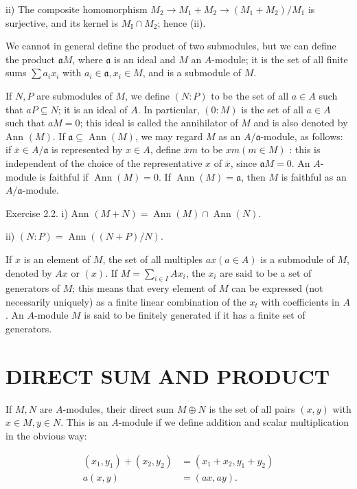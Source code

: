 \documentclass{standalone}
\theoremstyle{definition}
\theoremstyle{remark}
\begin{document}
ii) The composite homomorphism $M_{2} \rightarrow M_{1}+M_{2} \rightarrow\left(M_{1}+M_{2}\right) / M_{1}$ is surjective, and its kernel is $M_{\mathrm{I}} \cap M_{2}$; hence (ii).

We cannot in general define the product of two submodules, but we can define the product $\mathfrak{a} M$, where $\mathfrak{a}$ is an ideal and $M$ an $A$-module; it is the set of all finite sums $\sum a_{i} x_{i}$ with $a_{i} \in \mathfrak{a}, x_{i} \in M$, and is a submodule of $M$.

If $N, P$ are submodules of $M$, we define $(N: P)$ to be the set of all $a \in A$ such that $a P \subseteq N$; it is an ideal of $A$. In particular, $(0: M)$ is the set of all $a \in A$ such that $a M=0$; this ideal is called the annihilator of $M$ and is also denoted by Ann $(M)$. If $\mathfrak{a} \subseteq \operatorname{Ann}(M)$, we may regard $M$ as an $A / \mathfrak{a}$-module, as follows: if $\bar{x} \in A / \mathfrak{a}$ is represented by $x \in A$, define $\bar{x} m$ to be $x m(m \in M)$ : this is independent of the choice of the representative $x$ of $\bar{x}$, since $\mathfrak{a} M=0$. An $A$-module is faithful if $\operatorname{Ann}(M)=0$. If $\operatorname{Ann}(M)=\mathfrak{a}$, then $M$ is faithful as an $A / \mathfrak{a}$-module.

Exercise 2.2. i) Ann $(M+N)=\operatorname{Ann}(M) \cap \operatorname{Ann}(N)$.

ii) $(N: P)=\operatorname{Ann}((N+P) / N)$.

If $x$ is an element of $M$, the set of all multiples $a x(a \in A)$ is a submodule of $M$, denoted by $A x$ or $(x)$. If $M=\sum_{i \in I} A x_{i}$, the $x_{i}$ are said to be a set of generators of $M$; this means that every element of $M$ can be expressed (not necessarily uniquely) as a finite linear combination of the $x_{t}$ with coefficients in $A$. An $A$-module $M$ is said to be finitely generated if it has a finite set of generators.

\section{DIRECT SUM AND PRODUCT}
If $M, N$ are $A$-modules, their direct sum $M \oplus N$ is the set of all pairs $(x, y)$ with $x \in M, y \in N$. This is an $A$-module if we define addition and scalar multiplication in the obvious way:

\[
\begin{aligned}
\left(x_{1}, y_{1}\right)+\left(x_{2}, y_{2}\right) & =\left(x_{1}+x_{2}, y_{1}+y_{2}\right) \\
a(x, y) & =(a x, a y) .
\end{aligned}
\]
\end{document}
